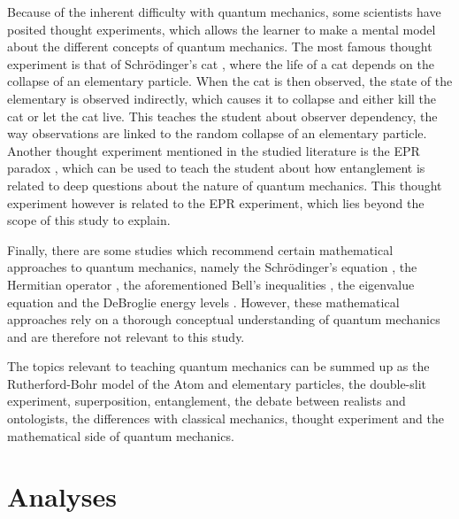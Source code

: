 \documentclass[11pt,twoside]{report} %
\begin{document}
Because of the inherent difficulty with quantum mechanics, some scientists have posited thought experiments, which allows the learner to make a mental model about the different concepts of quantum mechanics. The most famous thought experiment is that of Schrödinger's cat \cite{muller, velentzas}, where the life of a cat depends on the collapse of an elementary particle. When the cat is then observed, the state of the elementary is observed indirectly, which causes it to collapse and either kill the cat or let the cat live. This teaches the student about observer dependency, the way observations are linked to the random collapse of an elementary particle. Another thought experiment mentioned in the studied literature is the EPR paradox \cite{kuttner, muller, velentzas}, which can be used to teach the student about how entanglement is related to deep questions about the nature of quantum mechanics. This thought experiment however is related to the EPR experiment, which lies beyond the scope of this study to explain.

Finally, there are some studies which recommend certain mathematical approaches to quantum mechanics, namely the Schrödinger's equation \cite{muller, singh2}, the Hermitian operator \cite{singh2}, the aforementioned Bell's inequalities \cite{kuttner, muller}, the eigenvalue equation \cite{muller} and the DeBroglie energy levels \cite{dori, gianino, mckagan}. However, these mathematical approaches rely on a thorough conceptual understanding of quantum mechanics and are therefore not relevant to this study.

The topics relevant to teaching quantum mechanics can be summed up as the Rutherford-Bohr model of the Atom and elementary particles, the double-slit experiment, superposition, entanglement, the debate between realists and ontologists, the differences with classical mechanics, thought experiment and the mathematical side of quantum mechanics.

\chapter{Analyses}
\thispagestyle{fancy}
\end{document}
